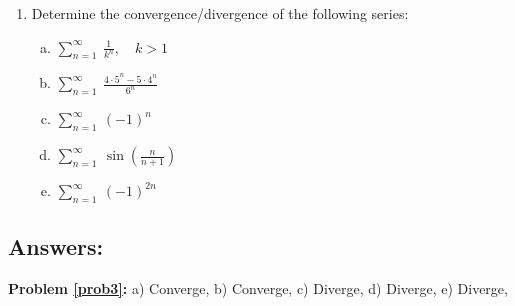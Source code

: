 \documentclass[10pt]{article}
\begin{document}
\begin{enumerate}

\item Determine the convergence/divergence of the following series: \label{prob3}
\begin{enumerate}[a)]

\item \(\sum_{n=1}^\infty \ \frac{1}{k^n}, \quad k>1\)\vfill

\item \(\sum_{n=1}^\infty \ \frac{4\cdot 5^n - 5\cdot 4^n}{6^n}\)\vfill

\item \(\sum_{n=1}^\infty \ (-1)^n\)\vfill

\item \(\sum_{n=1}^\infty \ \sin\left(\frac{n}{n+1}\right)\)\vfill

\item \(\sum_{n=1}^\infty \ (-1)^{2n}\)\vfill


\end{enumerate}


%
%
%
%
%
%


\end{enumerate}

\vfill

\subsection*{Answers:}
\textbf{Problem \ref{prob3}:} a) Converge, b) Converge, c) Diverge, d) Diverge, e) Diverge, %
\end{document}
